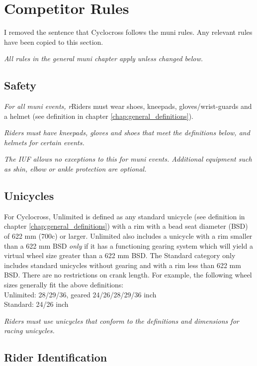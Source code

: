 \chapter{Competitor Rules}

\begin{framed}
I removed the sentence that Cyclocross follows the muni rules. Any relevant rules have been copied to this section.
\end{framed}

\textit{All rules in the general muni chapter apply unless changed below.}

\section{Safety}
\textit{For all muni events, r}Riders must wear shoes, kneepads, gloves/wrist-guards and a helmet (see definition in chapter \ref{chap:general_definitions}).

\textit{
Riders must have kneepads, gloves and shoes that meet the definitions below, and helmets for certain events.}

\textit{The IUF allows no exceptions to this for muni events. Additional equipment such as shin, elbow or ankle protection are optional.}

\section{Unicycles}

For Cyclocross, Unlimited is defined as any standard unicycle (see definition in chapter \ref{chap:general_definitions}) with a rim with a bead seat diameter (BSD) of 622 mm (700c) or larger.
Unlimited also includes a unicycle with a rim smaller than a 622 mm BSD {\em only} if it has a functioning gearing system which will yield a virtual wheel size greater than a 622 mm BSD.
The Standard category only includes standard unicycles without gearing and with a rim less than 622 mm BSD.
There are no restrictions on crank length.
For example, the following wheel sizes generally fit the above definitions: \\
Unlimited: 28/29/36, geared 24/26/28/29/36 inch \\
Standard: 24/26 inch

\textit{Riders must use unicycles that conform to the definitions and dimensions for racing unicycles.}

\section{Rider Identification}

